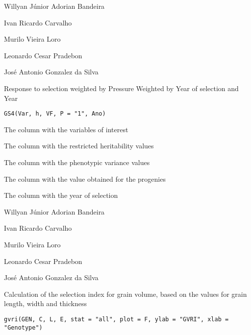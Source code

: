 \documentclass[a4paper]{book}
\begin{document}
%
\begin{Author}
Willyan Júnior Adorian Bandeira

Ivan Ricardo Carvalho

Murilo Vieira Loro

Leonardo Cesar Pradebon

José Antonio Gonzalez da Silva
\end{Author}
%
\begin{Description}
Response to selection weighted by Pressure Weighted by Year of selection and
Year
\end{Description}
%
\begin{Usage}
\begin{verbatim}
GS4(Var, h, VF, P = "1", Ano)
\end{verbatim}
\end{Usage}
%
\begin{Arguments}
\begin{ldescription}
\item[\code{Var}] The column with the variables of interest

\item[\code{h}] The column with the restricted heritability values

\item[\code{VF}] The column with the phenotypic variance values

\item[\code{P}] The column with the value obtained for the progenies

\item[\code{Year}] The column with the year of selection
\end{ldescription}
\end{Arguments}
%
\begin{Author}
Willyan Júnior Adorian Bandeira

Ivan Ricardo Carvalho

Murilo Vieira Loro

Leonardo Cesar Pradebon

José Antonio Gonzalez da Silva
\end{Author}
%
\begin{Description}
Calculation of the selection index for grain volume, based on the values for
grain length, width and thickness
\end{Description}
%
\begin{Usage}
\begin{verbatim}
gvri(GEN, C, L, E, stat = "all", plot = F, ylab = "GVRI", xlab = "Genotype")
\end{verbatim}
\end{Usage}
\end{document}
